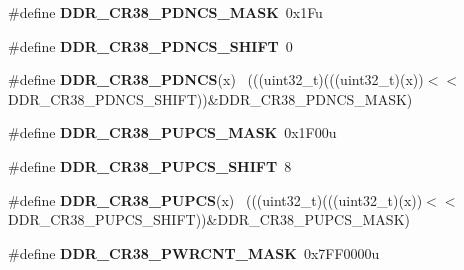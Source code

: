 \begin{DoxyCompactItemize}
\item 
\hypertarget{group___d_d_r___register___masks_gacd8658bbac033b55771043bb99229feb}{}\#define {\bfseries D\+D\+R\+\_\+\+C\+R38\+\_\+\+P\+D\+N\+C\+S\+\_\+\+M\+A\+S\+K}~0x1\+Fu\label{group___d_d_r___register___masks_gacd8658bbac033b55771043bb99229feb}

\item 
\hypertarget{group___d_d_r___register___masks_ga21e63b79de4950743e22c7e8eaff3067}{}\#define {\bfseries D\+D\+R\+\_\+\+C\+R38\+\_\+\+P\+D\+N\+C\+S\+\_\+\+S\+H\+I\+F\+T}~0\label{group___d_d_r___register___masks_ga21e63b79de4950743e22c7e8eaff3067}

\item 
\hypertarget{group___d_d_r___register___masks_ga2c1323540a48f8751e6ff492e1b813ab}{}\#define {\bfseries D\+D\+R\+\_\+\+C\+R38\+\_\+\+P\+D\+N\+C\+S}(x)                                            ~(((uint32\+\_\+t)(((uint32\+\_\+t)(x))$<$$<$D\+D\+R\+\_\+\+C\+R38\+\_\+\+P\+D\+N\+C\+S\+\_\+\+S\+H\+I\+F\+T))\&D\+D\+R\+\_\+\+C\+R38\+\_\+\+P\+D\+N\+C\+S\+\_\+\+M\+A\+S\+K)\label{group___d_d_r___register___masks_ga2c1323540a48f8751e6ff492e1b813ab}

\item 
\hypertarget{group___d_d_r___register___masks_ga7e14511b6ffff003820ebeaa5b60cb9d}{}\#define {\bfseries D\+D\+R\+\_\+\+C\+R38\+\_\+\+P\+U\+P\+C\+S\+\_\+\+M\+A\+S\+K}~0x1\+F00u\label{group___d_d_r___register___masks_ga7e14511b6ffff003820ebeaa5b60cb9d}

\item 
\hypertarget{group___d_d_r___register___masks_ga84618075a76fec149f19dd1ed8e5dfe5}{}\#define {\bfseries D\+D\+R\+\_\+\+C\+R38\+\_\+\+P\+U\+P\+C\+S\+\_\+\+S\+H\+I\+F\+T}~8\label{group___d_d_r___register___masks_ga84618075a76fec149f19dd1ed8e5dfe5}

\item 
\hypertarget{group___d_d_r___register___masks_gaea270fa332a8609c34e6a08a4cbca273}{}\#define {\bfseries D\+D\+R\+\_\+\+C\+R38\+\_\+\+P\+U\+P\+C\+S}(x)                                            ~(((uint32\+\_\+t)(((uint32\+\_\+t)(x))$<$$<$D\+D\+R\+\_\+\+C\+R38\+\_\+\+P\+U\+P\+C\+S\+\_\+\+S\+H\+I\+F\+T))\&D\+D\+R\+\_\+\+C\+R38\+\_\+\+P\+U\+P\+C\+S\+\_\+\+M\+A\+S\+K)\label{group___d_d_r___register___masks_gaea270fa332a8609c34e6a08a4cbca273}

\item 
\hypertarget{group___d_d_r___register___masks_ga2e73f54f232e5ba4a3ae98e1cc7b2e7b}{}\#define {\bfseries D\+D\+R\+\_\+\+C\+R38\+\_\+\+P\+W\+R\+C\+N\+T\+\_\+\+M\+A\+S\+K}~0x7\+F\+F0000u\label{group___d_d_r___register___masks_ga2e73f54f232e5ba4a3ae98e1cc7b2e7b}


\end{DoxyCompactItemize}
